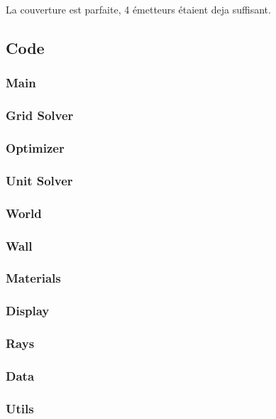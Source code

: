\documentclass[sn-mathphys-num]{sn-jnl}%
\theoremstyle{thmstyleone}%
\theoremstyle{thmstyletwo}%
\theoremstyle{thmstylethree}%
\begin{document}
La couverture est parfaite, 4 émetteurs étaient deja suffisant.


\subsection{Code}

\subsubsection{Main}



\subsubsection{Grid Solver}



\subsubsection{Optimizer}



\subsubsection{Unit Solver}



\subsubsection{World}



\subsubsection{Wall}



\subsubsection{Materials}



\subsubsection{Display}



\subsubsection{Rays}



\subsubsection{Data}
\label{sub:data}



\subsubsection{Utils}


\end{document}
